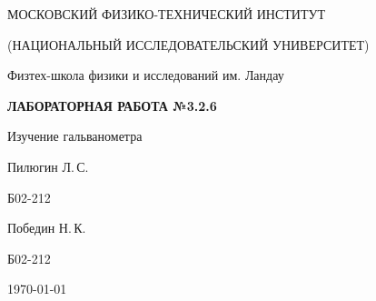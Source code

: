 
\begin{center}
    {
        \MakeUppercase{Московский физико-технический институт}

        \MakeUppercase{(Национальный исследовательский университет)}
    }

    {
        Физтех-школа физики и исследований им. Ландау
    }
    
    \vspace{200pt}
    {
        \Huge
        \bfseries
        \MakeUppercase{Лабораторная работа №3.2.6}
    }

    \vspace{24pt}
    {
        \Large
        Изучение гальванометра
    }

    \vspace{24pt}
    {
        \large
        Пилюгин Л.\,С.

        Б02-212
    }

    {
        \large
        Победин Н.\,К.

        Б02-212
    }

    \vspace{2pt}
    {
        \large
        \today
    }
\end{center}

\newpage
{}
\setcounter{page}{2}
